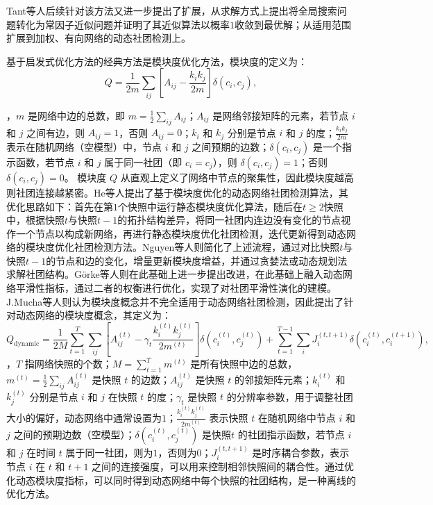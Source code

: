 Tant等人后续针对该方法又进一步提出了扩展，从求解方式上提出将全局搜索问题转化为常因子近似问题并证明了其近似算法以概率$1$收敛到最优解\cite{tantipathananandh2009constant}；从适用范围扩展到加权、有向网络的动态社团检测上\cite{tantipathananandh2011finding}。

基于启发式优化方法的经典方法是模块度优化方法，模块度\cite{zhang2024inductive}的定义为：
\begin{equation}
	Q = \frac{1}{2m} \sum_{ij} \left[ A_{ij} - \frac{k_i k_j}{2m} \right] \delta(c_i, c_j),
\end{equation}

，\( m \) 是网络中边的总数，即 \( m = \frac{1}{2} \sum_{ij} A_{ij} \)；\( A_{ij} \) 是网络邻接矩阵的元素，若节点 \( i \) 和 \( j \) 之间有边，则 \( A_{ij} = 1 \)，否则 \( A_{ij} = 0 \)；\( k_i \) 和 \( k_j \) 分别是节点 \( i \) 和 \( j \) 的度；\( \frac{k_i k_j}{2m} \) 表示在随机网络（空模型）中，节点 \( i \) 和 \( j \) 之间预期的边数；\( \delta(c_i, c_j) \) 是一个指示函数，若节点 \( i \) 和 \( j \) 属于同一社团（即 \( c_i = c_j \)），则 \( \delta(c_i, c_j) = 1 \)；否则 \( \delta(c_i, c_j) = 0 \)。
模块度 \( Q \) 从直观上定义了网络中节点的聚集性，因此模块度越高则社团连接越紧密。He等人\cite{he2015fast}提出了基于模块度优化的动态网络社团检测算法，其优化思路如下：首先在第\(1\)个快照中运行静态模块度优化算法，随后在$t \ge 2$快照中，根据快照$t$与快照$t-1$的拓扑结构差异，将同一社团内连边没有变化的节点视作一个节点以构成新网络，再进行静态模块度优化社团检测，迭代更新得到动态网络的模块度优化社团检测方法。Nguyen等人\cite{nguyen2011adaptive}则简化了上述流程，通过对比快照$t$与快照$t-1$的节点和边的变化，增量更新模块度增益，并通过贪婪法或动态规划法求解社团结构。G{\"o}rke等人\cite{gorke2013dynamic}则在此基础上进一步提出改进，在此基础上融入动态网络平滑性指标，通过二者的权衡进行优化，实现了对社团平滑性演化的建模。J.Mucha等人\cite{mucha2010community}则认为模块度概念并不完全适用于动态网络社团检测，因此提出了针对动态网络的模块度概念，其定义为：
\begin{equation}
	Q_{\text{dynamic}} = \frac{1}{2M} \sum_{t=1}^{T} \sum_{ij} \left[ A_{ij}^{(t)} - \gamma_t \frac{k_i^{(t)} k_j^{(t)}}{2m^{(t)}} \right] \delta(c_i^{(t)}, c_j^{(t)}) + \sum_{t=1}^{T-1} \sum_{i} J_{i}^{(t, t+1)} \delta(c_i^{(t)}, c_i^{(t+1)}),
\end{equation}
，\( T \) 指网络快照的个数；\( M = \sum_{t=1}^{T} m^{(t)} \) 是所有快照中边的总数，\( m^{(t)} = \frac{1}{2} \sum_{ij} A_{ij}^{(t)} \) 是快照 \( t \) 的边数；\( A_{ij}^{(t)} \) 是快照 \( t \) 的邻接矩阵元素；\( k_i^{(t)} \) 和 \( k_j^{(t)} \) 分别是节点 \( i \) 和 \( j \) 在快照 \( t \) 的度；\( \gamma_t \) 是快照 \( t \) 的分辨率参数，用于调整社团大小的偏好，动态网络中通常设置为$1$；\( \frac{k_i^{(t)} k_j^{(t)}}{2m^{(t)}} \) 表示快照 \( t \) 在随机网络中节点 \( i \) 和 \( j \) 之间的预期边数（空模型）；\( \delta(c_i^{(t)}, c_j^{(t)}) \) 是快照\( t \) 的社团指示函数，若节点 \( i \) 和 \( j \) 在时间 \( t \) 属于同一社团，则为$1$，否则为$0$；\( J_{i}^{(t, t+1)} \) 是时序耦合参数，表示节点 \( i \) 在 \( t \) 和 \( t+1 \) 之间的连接强度，可以用来控制相邻快照间的耦合性。通过优化动态模块度指标，可以同时得到动态网络中每个快照的社团结构，是一种离线的优化方法\cite{sarzynska2016null,10452807}。

